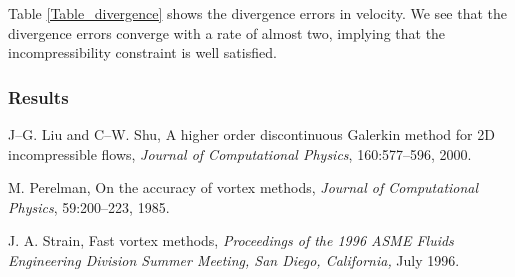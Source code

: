 \documentclass[11pt]{article}
\begin{document}
Table \ref{Table_divergence} shows the divergence errors in velocity. We see that the divergence errors converge with a rate of almost two, implying that the incompressibility constraint is well satisfied.

\subsubsection{Results}






\begin{thebibliography}{99}
 J--G. Liu and C--W. Shu, A higher order discontinuous Galerkin method for 2D incompressible flows, \textsl{Journal of Computational Physics}, 160:577--596, 2000.

 M. Perelman, On the accuracy of vortex methods, \textsl{Journal of Computational Physics}, 59:200--223, 1985.

 J. A. Strain, Fast vortex methods, \textsl{Proceedings of the 1996 ASME Fluids Engineering Division Summer Meeting, San Diego, California,} July 1996.




\end{thebibliography}
\end{document}
